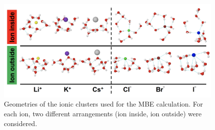 \begin{figure}[t]
\uwsinglespace
\centering
\includegraphics[width=\textwidth]{Figures/Chapter_3/figure_1.pdf}
\begin{spacing}{1.0}
\caption[Geometries of the ionic clusters used for the MBE calculation. For each ion, two different arrangements (ion inside, ion outside) were considered.]{Geometries of the ionic clusters used for the MBE calculation. For each ion, two different arrangements (ion inside, ion outside) were considered.}\label{fig:MBE_II_1}
\end{spacing}
\end{figure}